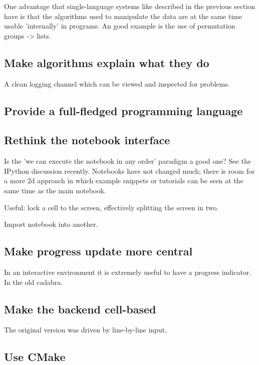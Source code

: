 \documentclass[11pt]{article}
\begin{document}
One advantage that single-language systems like described in the
previous section have is that the algorithms used to manipulate the
data are at the same time usable 'internally' in programs. An good
example is the use of permutation groups -> lists.

\subsection{Make algorithms explain what they do}

A clean logging channel which can be viewed and inspected for problems.


\subsection{Provide a full-fledged programming language}



\subsection{Rethink the notebook interface}

Is the 'we can execute the notebook in any order' paradigm a good one?
See the IPython discussion recently. Notebooks have not changed much;
there is room for a more 2d approach in which example snippets or
tutorials can be seen at the same time as the main notebook.

Useful: lock a cell to the screen, effectively splitting the screen in
two. 

Import notebook into another. 

\subsection{Make progress update more central}

In an interactive environment it is extremely useful to have a
progress indicator. In the old cadabra.

\subsection{Make the backend cell-based}

The original version was driven by line-by-line input, 


\subsection{Use CMake}
\end{document}
